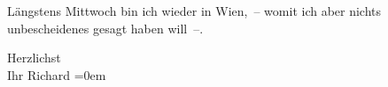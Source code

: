 \pstart
           Längstens Mittwoch bin ich wieder in Wien, – womit ich aber nichts unbescheidenes gesagt haben will –.\pend
           
\pstart
           Herzlichst {\\[\baselineskip]}Ihr \spacefill\mbox{Richard}\pend
           \leftskip=0em{}\endnumbering{}  \newcommand{\dateiname}{L00913}\newcommand{\titel}{Richard Beer-Hofmann an Arthur Schnitzler, 28. 4. 1899}\newcommand{\editorInnen}{Martin Anton Müller und Gerd-Hermann Susen}
